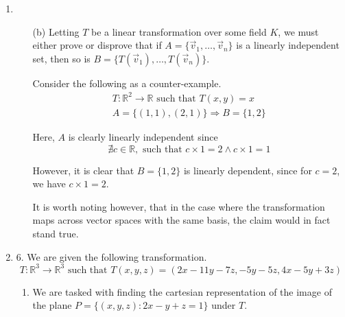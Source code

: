 \documentclass{article}
\newenvironment{answers}{ %
	\begin{enumerate}
		\setlength{\itemsep}{\bigskipamount}
}{\end{enumerate}}
\newcommand{\R}{\mathbb{R}}
\newcommand{\st}{\text{ such that }}
\begin{document}
\begin{answers}
\begin{enumerate}
				By applying the transformation to each \((x,y)\), it simply makes \(x\) into \(y\) and vice versa. Therefore the images \(L'_1\) and \(L'_2\) of \(L_1\) and \(L_2\) respectively are the following.
				\begin{gather*}
					L'_1 = \{(x,y) : x - y = 0\} \\
					L'_2 = \{(x,y) : y + 3x = 0\}
				\end{gather*}
		\end{enumerate}

	\item
		\begin{enumerate}
			\item[(b)]
				Letting \(T\) be a linear transformation over some field \(K\), we must either prove or disprove that if \(A = \{\vec{v}_1,\dots,\vec{v}_n\}\) is a linearly independent set, then so is \(B = \{T(\vec{v}_1),\dots,T(\vec{v}_n)\}\).

				Consider the following as a counter-example.
				\begin{gather*}
					T: \R^2 \to \R \st T(x, y) = x \\
					A = \{(1, 1), (2, 1)\} \Rightarrow B = \{1, 2\}
				\end{gather*}

				Here, \(A\) is clearly linearly independent since
				\begin{equation*}
					\nexists c \in \R,\st c \times 1 = 2 \land c \times 1 = 1
				\end{equation*}

				However, it is clear that \(B = \{1, 2\}\) is linearly dependent, since for \(c = 2\), we have \(c \times 1 = 2\).

				It is worth noting however, that in the case where the transformation maps across vector spaces with the same basis, the claim would in fact stand true.
		\end{enumerate}

	\item[6.]
		We are given the following transformation.
		\begin{equation*}
			T: \R^3 \to \R^3 \st T(x, y, z) = (2x - 11y - 7z, -5y - 5z, 4x - 5y + 3z)
		\end{equation*}
		\begin{enumerate}
			\item
				We are tasked with finding the cartesian representation of the image of the plane \(P = \{(x,y,z):2x-y+z=1\}\) under \(T\).


\end{enumerate}
\end{answers}
\end{document}
